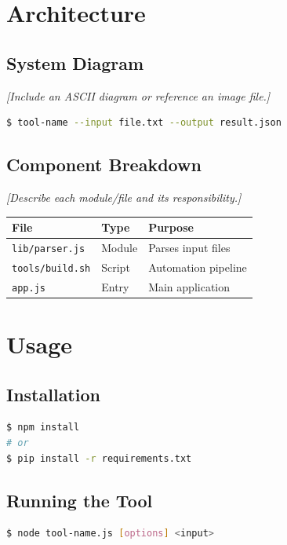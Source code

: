 \documentclass[11pt,a4paper]{report}
\begin{document}
\chapter{Architecture}

\section{System Diagram}
\textit{[Include an ASCII diagram or reference an image file.]}

\begin{lstlisting}[language=bash,caption=High-level command]
$ tool-name --input file.txt --output result.json
\end{lstlisting}

\section{Component Breakdown}
\textit{[Describe each module/file and its responsibility.]}

\begin{longtable}{@{}llp{8cm}@{}}
\toprule
\textbf{File} & \textbf{Type} & \textbf{Purpose} \\
\midrule
\endhead
\texttt{lib/parser.js} & Module & Parses input files \\
\texttt{tools/build.sh} & Script & Automation pipeline \\
\texttt{app.js} & Entry & Main application \\
\bottomrule
\end{longtable}

\chapter{Usage}

\section{Installation}
\begin{lstlisting}[language=bash,caption=Install dependencies]
$ npm install
# or
$ pip install -r requirements.txt
\end{lstlisting}

\section{Running the Tool}
\begin{lstlisting}[language=bash,caption=Basic usage]
$ node tool-name.js [options] <input>
\end{lstlisting}
\end{document}
